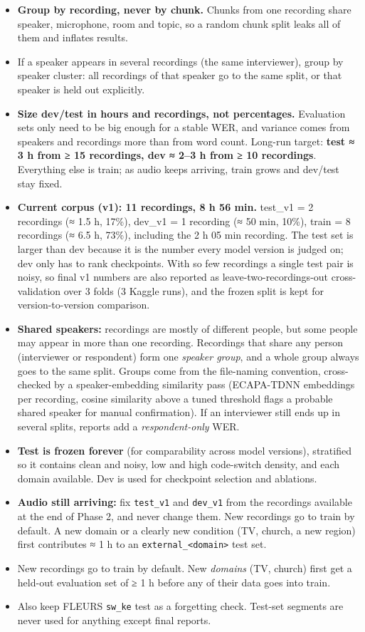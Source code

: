 \documentclass[11pt]{article}
\begin{document}
\begin{itemize}
\tightlist
\item
  \textbf{Group by recording, never by chunk.} Chunks from one recording share speaker, microphone, room and topic, so a random chunk split leaks all of them and inflates results.
\item
  If a speaker appears in several recordings (the same interviewer), group by speaker cluster: all recordings of that speaker go to the same split, or that speaker is held out explicitly.
\item
  \textbf{Size dev/test in hours and recordings, not percentages.} Evaluation sets only need to be big enough for a stable WER, and variance comes from speakers and recordings more than from word count. Long-run target: \textbf{test ≈ 3 h from ≥ 15 recordings, dev ≈ 2--3 h from ≥ 10 recordings}. Everything else is train; as audio keeps arriving, train grows and dev/test stay fixed.
\item
  \textbf{Current corpus (v1): 11 recordings, 8 h 56 min.} test\_v1 = 2 recordings (≈ 1.5 h, 17\%), dev\_v1 = 1 recording (≈ 50 min, 10\%), train = 8 recordings (≈ 6.5 h, 73\%), including the 2 h 05 min recording. The test set is larger than dev because it is the number every model version is judged on; dev only has to rank checkpoints. With so few recordings a single test pair is noisy, so final v1 numbers are also reported as leave-two-recordings-out cross-validation over 3 folds (3 Kaggle runs), and the frozen split is kept for version-to-version comparison.
\item
  \textbf{Shared speakers:} recordings are mostly of different people, but some people may appear in more than one recording. Recordings that share any person (interviewer or respondent) form one \emph{speaker group}, and a whole group always goes to the same split. Groups come from the file-naming convention, cross-checked by a speaker-embedding similarity pass (ECAPA-TDNN embeddings per recording, cosine similarity above a tuned threshold flags a probable shared speaker for manual confirmation). If an interviewer still ends up in several splits, reports add a \emph{respondent-only} WER.
\item
  \textbf{Test is frozen forever} (for comparability across model versions), stratified so it contains clean and noisy, low and high code-switch density, and each domain available. Dev is used for checkpoint selection and ablations.
\item
  \textbf{Audio still arriving:} fix \texttt{test\_\allowbreak{}v1} and \texttt{dev\_\allowbreak{}v1} from the recordings available at the end of Phase 2, and never change them. New recordings go to train by default. A new domain or a clearly new condition (TV, church, a new region) first contributes ≈ 1 h to an \texttt{external\_\allowbreak{}<domain>} test set.
\item
  New recordings go to train by default. New \emph{domains} (TV, church) first get a held-out evaluation set of ≥ 1 h before any of their data goes into train.
\item
  Also keep FLEURS \texttt{sw\_\allowbreak{}ke} test as a forgetting check. Test-set segments are never used for anything except final reports.
\end{itemize}
\end{document}
